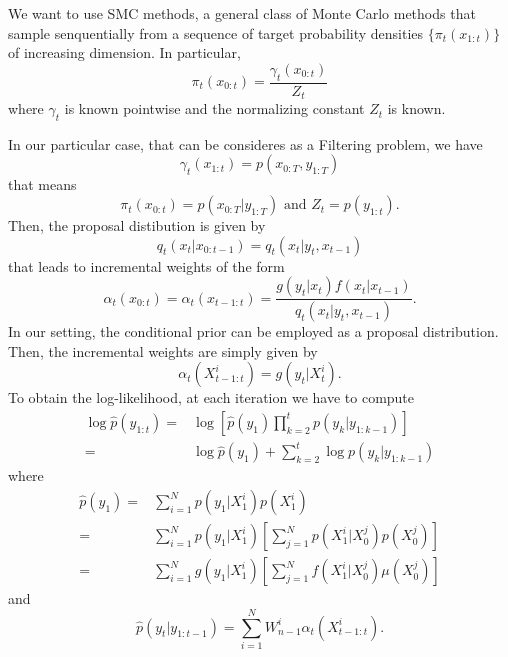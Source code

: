 \documentclass[]{article}
\begin{document}
	We want to use SMC methods, a general class of Monte Carlo methods that sample senquentially from a sequence of target probability densities $\{ \pi_t(x_{1:t}) \}$ of increasing dimension. In particular, 
	$$
	\pi_t(x_{0:t}) = \frac{\gamma_t(x_{0:t})}{Z_t}
	$$
	where 
	$\gamma_t$ is known pointwise and the normalizing constant $Z_t$ is known.
	
	In our particular case, that can be consideres as a Filtering problem, we have
	$$
	\gamma_t(x_{1:t}) = p(x_{0:T},y_{1:T})
	$$ 
	that means
	$$
	\pi_t(x_{0:t}) = p(x_{0:T}|y_{1:T}) \text{ and } Z_t = p(y_{1:t}).
	$$
	Then, the proposal distibution is given by 
	$$
	q_t(x_t|x_{0:t-1}) = q_t(x_t|y_t, x_{t-1})
	$$
	that leads to incremental weights of the form
	$$
	\alpha_t(x_{0:t}) = \alpha_t(x_{t-1:t}) = \frac{g(y_t|x_t)f(x_t|x_{t-1})}{q_t(x_t|y_t, x_{t-1})}.  
	$$
	In our setting, the conditional prior can be employed as a proposal distribution. Then, the incremental weights are simply given by
	$$
	\alpha_t(X_{t-1:t}^i) = g(y_t|X_t^i).
	$$
	To obtain the log-likelihood, at each iteration we have to compute
	\begin{align*}
	\log\hat{p}(y_{1:t}) = & \log[ \hat{p}(y_1) \prod_{k=2}^{t} p(y_k|y_{1:k-1})] \\
	= & \log \hat{p}(y_1) + \sum_{k=2}^{t} \log p(y_k|y_{1:k-1})
	\end{align*}
	where
	\begin{align*}
	\hat{p}(y_1) = & \sum_{i=1}^{N} p(y_1|X_1^i)p(X_1^i) \\
	= & \sum_{i=1}^{N} p(y_1|X_1^i)[\sum_{j=1}^{N}p(X_1^i|X_0^j)p(X_0^j)] \\
	= & \sum_{i=1}^{N} g(y_1|X_1^i)[\sum_{j=1}^{N}f(X_1^i|X_0^j)\mu(X_0^j)]
	\end{align*}
	and
	$$
	\hat{p}(y_t|y_{1:t-1}) = \sum_{i=1}^{N}W_{n-1}^i\alpha_t(X_{t-1:t}^i).
	$$
\end{document}
